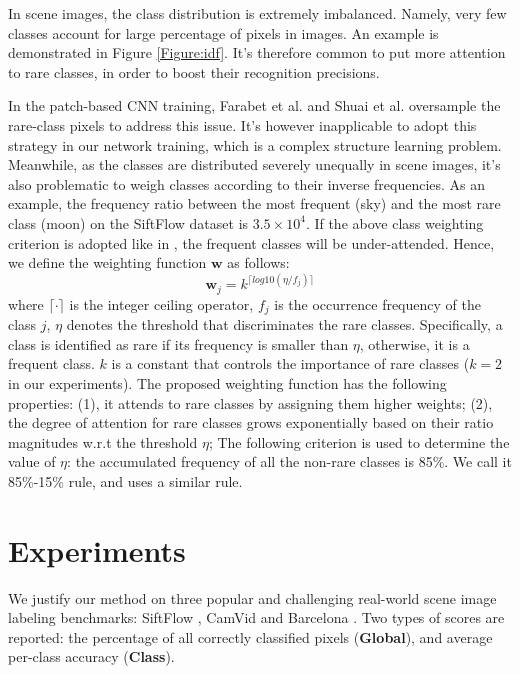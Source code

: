 \documentclass[10pt,twocolumn,letterpaper]{article}
\begin{document}
In scene images, the class distribution is extremely imbalanced. Namely, very few classes account for large percentage of pixels in images. An example is demonstrated in Figure \ref{Figure:idf}. It's therefore common to put more attention to rare classes, in order to boost their recognition precisions.

In the patch-based CNN training, Farabet et al. \cite{farabet2013learning} and Shuai et al. \cite{shuai2015integrating} oversample the rare-class pixels to address this issue. It's however inapplicable to adopt this strategy in our network training, which is a complex structure learning problem.
Meanwhile, as the classes are distributed severely unequally in scene images, it's also problematic to weigh classes according to their inverse frequencies. As an example, the frequency ratio between the most frequent (sky) and the most rare class (moon) on the SiftFlow dataset is $3.5 \times 10^4$.  If the above class weighting criterion is adopted like in \cite{mostajabi2015feedforward}, the frequent classes will be under-attended.  Hence, we define the weighting function $\mathbf{w}$ as follows:
\begin{equation}
 \mathbf{w}_j = k^{\lceil log10(\eta / f_j) \rceil}
\end{equation}
where $\lceil \cdot \rceil$ is the integer ceiling operator, $f_j$ is the occurrence frequency of the class $j$, $\eta$ denotes the threshold that discriminates the rare classes. Specifically, a class is identified as rare if its frequency is smaller than $\eta$, otherwise, it is a frequent class. $k$ is a constant that controls the importance of rare classes ($k=2$ in our experiments). The proposed weighting function has the following properties: (1), it attends to rare classes by assigning them higher weights; (2), the degree of attention for rare classes grows exponentially based on their ratio magnitudes w.r.t the threshold $\eta$;
The following criterion is used to determine the value of $\eta$: the accumulated frequency of  all the non-rare classes is 85\%. We call it 85\%-15\% rule, and \cite{yang2014context} uses a similar rule.




\section{Experiments}
\label{Section:experiments}
We justify our method on three popular and challenging real-world scene image labeling benchmarks: SiftFlow \cite{liu2009nonparametric}, CamVid \cite{BrostowSFC:ECCV08} and Barcelona \cite{tighe2010superparsing}. Two types of scores are reported: the percentage of all correctly classified pixels (\textbf{Global}), and average per-class accuracy (\textbf{Class}).
\end{document}

